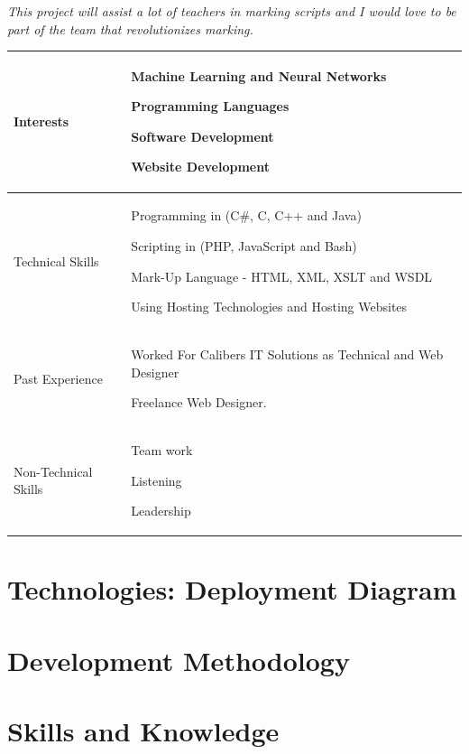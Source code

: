\documentclass{article}
\begin{document}
 	\textit{This project will assist a lot of teachers in marking scripts and I would love to be part of the team that revolutionizes marking.}

\begin{center}
\begin{tabularx}{1.0\textwidth}{|p{3cm}|X|}
\hline
 {\LARGE Interests} & 
 \begin{compactitem}
     \item {\large Machine Learning and Neural Networks}
     \item {\large Programming Languages}
     \item {\large Software Development}
     \item {\large Website Development}
 \end{compactitem} \\ 
 \hline
 {\LARGE Technical Skills} & 
 \begin{compactitem}
     \item {\large Programming in (C#, C, C++ and Java)} 
     \item {\large Scripting in (PHP, JavaScript and Bash)}
     \item {\large Mark-Up Language - HTML, XML, XSLT and WSDL}
     \item {\large Using Hosting Technologies and Hosting Websites}
 \end{compactitem} \\ 
 \hline
 {\LARGE Past Experience} & 
 \begin{compactitem}
     \item {\large Worked For Calibers IT Solutions as Technical and Web Designer}
     \item {\large Freelance Web Designer.}
 \end{compactitem} \\ 
 \hline
 {\LARGE Non-Technical Skills} & 
 \begin{compactitem}
     \item {\large Team work}
     \item {\large Listening}
     \item {\large Leadership}
 \end{compactitem} \\
 \hline 
\end{tabularx}
\end{center}
\pagebreak
\section{Technologies: Deployment Diagram}

\section{Development Methodology}

\section{Skills and Knowledge}
\end{document}
